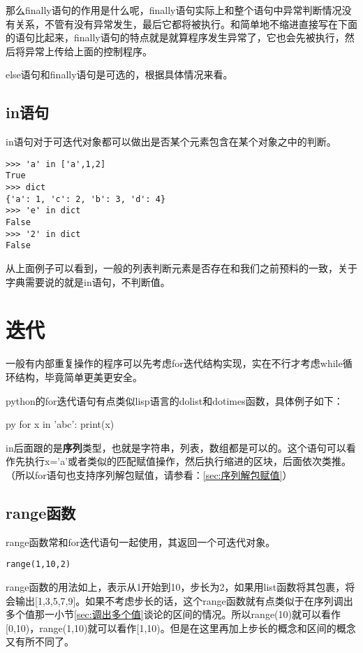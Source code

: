 \documentclass[12pt,oneside]{book}
\begin{document}
\begin{common-format}
那么finally语句的作用是什么呢，finally语句实际上和整个语句中异常判断情况没有关系，不管有没有异常发生，最后它都将被执行。和简单地不缩进直接写在下面的语句比起来，finally语句的特点就是就算程序发生异常了，它也会先被执行，然后将异常上传给上面的控制程序。

else语句和finally语句是可选的，根据具体情况来看。

\subsection{in语句}
in语句对于可迭代对象都可以做出是否某个元素包含在某个对象之中的判断。
\begin{Verbatim}
>>> 'a' in ['a',1,2]
True
>>> dict
{'a': 1, 'c': 2, 'b': 3, 'd': 4}
>>> 'e' in dict
False
>>> '2' in dict
False
\end{Verbatim}
从上面例子可以看到，一般的列表判断元素是否存在和我们之前预料的一致，关于字典需要说的就是in语句，不判断值。


\section{迭代}
一般有内部重复操作的程序可以先考虑for迭代结构实现，实在不行才考虑while循环结构，毕竟简单更美更安全。

python的for迭代语句有点类似lisp语言的dolist和dotimes函数，具体例子如下：
\begin{xverbatim}[129]{py}
for x in 'abc':
    print(x)
\end{xverbatim}
in后面跟的是\textbf{序列}类型，也就是字符串，列表，数组都是可以的。这个语句可以看作先执行x='a'或者类似的匹配赋值操作，然后执行缩进的区块，后面依次类推。（所以for语句也支持序列解包赋值，请参看：\ref{sec:序列解包赋值}）


\subsection{range函数}
range函数常和for迭代语句一起使用，其返回一个可迭代对象。

\begin{Verbatim}
range(1,10,2)
\end{Verbatim}

range函数的用法如上，表示从1开始到10，步长为2，如果用list函数将其包裹，将会输出[1,3,5,7,9]。如果不考虑步长的话，这个range函数就有点类似于在序列调出多个值那一小节\ref{sec:调出多个值}谈论的区间的情况。所以range(10)就可以看作[0,10)，range(1,10)就可以看作[1,10)。但是在这里再加上步长的概念和区间的概念又有所不同了。


\end{common-format}
\end{document}
